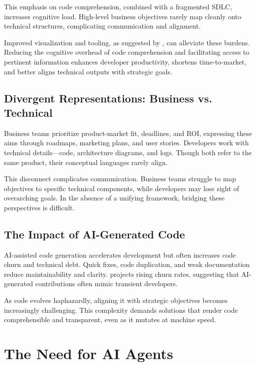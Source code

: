 \documentclass[12pt,twocolumn]{article}
\begin{document}
This emphasis on code comprehension, combined with a fragmented SDLC, increases cognitive load. High-level business 
objectives rarely map cleanly onto technical structures, complicating communication and alignment.

Improved visualization and tooling, as suggested by \textcite{meyer2021today}, can alleviate these burdens. 
Reducing the cognitive overhead of code comprehension and facilitating access to pertinent information enhances 
developer productivity, shortens time-to-market, and better aligns technical outputs with strategic goals.

\subsection{Divergent Representations: Business vs. Technical}

Business teams prioritize product-market fit, deadlines, and ROI, expressing these aims through roadmaps, marketing plans,
and user stories. Developers work with technical details—code, architecture diagrams, and logs. Though both refer to the same 
product, their conceptual languages rarely align.

This disconnect complicates communication. Business teams struggle to map objectives to specific technical components,
while developers may lose sight of overarching goals. 
In the absence of a unifying framework, bridging these perspectives is difficult.

\subsection{The Impact of AI-Generated Code}

AI-assisted code generation accelerates development but often increases code churn and technical debt. Quick fixes, 
code duplication, and weak documentation reduce maintainability and clarity.  \textcite{gitclear2024} projects rising churn rates, 
suggesting that AI-generated contributions often mimic transient developers.

As code evolves haphazardly, aligning it with strategic objectives becomes increasingly challenging. This complexity 
demands solutions that render code comprehensible and transparent, 
even as it mutates at machine speed.

\section{The Need for AI Agents}
\end{document}
